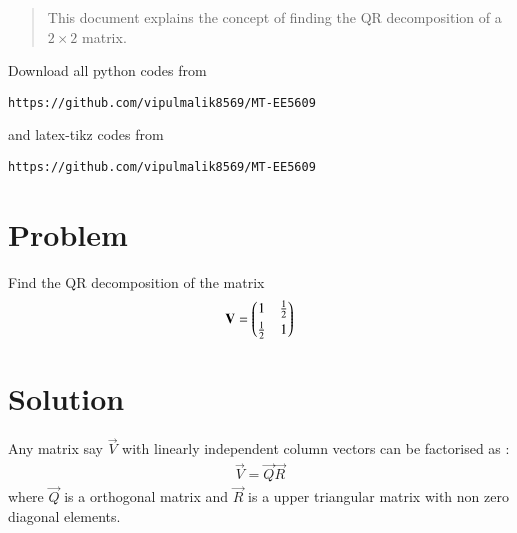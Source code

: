 \documentclass[journal,12pt,twocolumn]{IEEEtran}
\begin{document}
\date{\today}

\maketitle
\newpage
\bigskip
\renewcommand{\thefigure}{\theenumi}
\renewcommand{\thetable}{\theenumi}

\begin{abstract}
This document explains the concept of finding the QR decomposition of a $2\times2$ matrix.
\end{abstract}
Download all python codes from 
\begin{lstlisting}
https://github.com/vipulmalik8569/MT-EE5609
\end{lstlisting}

and latex-tikz codes from 
\begin{lstlisting}
https://github.com/vipulmalik8569/MT-EE5609
\end{lstlisting}
\section{\textbf{Problem}}
Find the QR decomposition of the matrix
\begin{align}
    \mathbf{V}=\begin{pmatrix}1&\frac{1}{2}\\[0.1cm]\frac{1}{2}&1\end{pmatrix}\label{eq:0}
\end{align}
\section{\textbf{Solution}}
Any matrix say $\vec{V}$ with linearly independent column vectors can be factorised as : 
\begin{align}
    \vec{V} = \vec{Q}\vec{R}\label{eq:1}
\end{align}
where $\vec{Q}$ is a orthogonal matrix and $\vec{R}$ is a upper triangular matrix with non zero diagonal elements.
\end{document}
